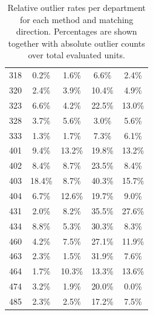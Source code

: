 \begin{table}[ht]
\begin{tabular}{lcccc}
        318 & 0.2\% & 1.6\% & 6.6\% & 2.4\% \\
        320 & 2.4\% & 3.9\% & 10.4\% & 4.9\% \\
        323 & 6.6\% & 4.2\% & 22.5\% & 13.0\% \\
        328 & 3.7\% & 5.6\% & 3.0\% & 5.6\% \\
        333 & 1.3\% & 1.7\% & 7.3\% & 6.1\% \\
        401 & 9.4\% & 13.2\% & 19.8\% & 13.2\% \\
        402 & 8.4\% & 8.7\% & 23.5\% & 8.4\% \\
        403 & 18.4\% & 8.7\% & 40.3\% & 15.7\% \\
        404 & 6.7\% & 12.6\% & 19.7\% & 9.0\% \\
        431 & 2.0\% & 8.2\% & 35.5\% & 27.6\% \\
        434 & 8.8\% & 5.3\% & 30.3\% & 8.3\% \\
        460 & 4.2\% & 7.5\% & 27.1\% & 11.9\% \\
        463 & 2.3\% & 1.5\% & 31.9\% & 7.6\% \\
        464 & 1.7\% & 10.3\% & 13.3\% & 13.6\% \\
        474 & 3.2\% & 1.9\% & 20.0\% & 0.0\% \\
        485 & 2.3\% & 2.5\% & 17.2\% & 7.5\% \\
        \hline
    \end{tabular}
    \caption{Relative outlier rates per department for each method and matching direction. Percentages are shown together with absolute outlier counts over total evaluated units.}
    \label{tab:dept_outlier_rates}
\end{table}
